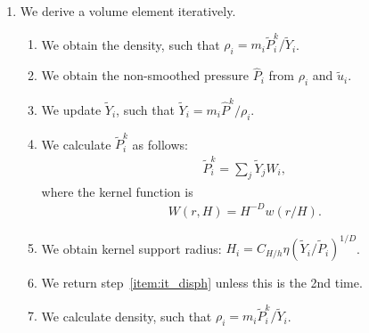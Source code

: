 \documentclass[fleqn,dvipdfmx]{article}
\begin{document}
\begin{enumerate}
\item We derive a volume element iteratively.

  \begin{enumerate}
  \item \label{item:it_disph} We obtain the density, such that $\rho_i
    = m_i \tilde{P}_i^k / \tilde{Y}_i$.

  \item We obtain the non-smoothed pressure $\hat{P}_i$ from $\rho_i$
    and $\tilde{u}_i$.

  \item We update $\tilde{Y}_i$, such that $\tilde{Y}_i = m_i \hat{P}^k
    / \rho_i$.

  \item We calculate $\tilde{P}_i^k$ as follows:
    \begin{align}
      \tilde{P}_i^k = \sum_j \tilde{Y}_j W_i,
    \end{align}
    where the kernel function is
    \begin{align}
      W(r,H) = H^{-D} w(r/H).
    \end{align}

  \item We obtain kernel support radius: $H_i = C_{H/h} \eta
    (\tilde{Y}_i/\tilde{P}_i)^{1/D}$.

  \item We return step~\ref{item:it_disph} unless this is the 2nd time.

  \item We calculate density, such that $\rho_i = m_i \tilde{P}_i^k /
    \tilde{Y}_i$.

  \end{enumerate}


\end{enumerate}
\end{document}
